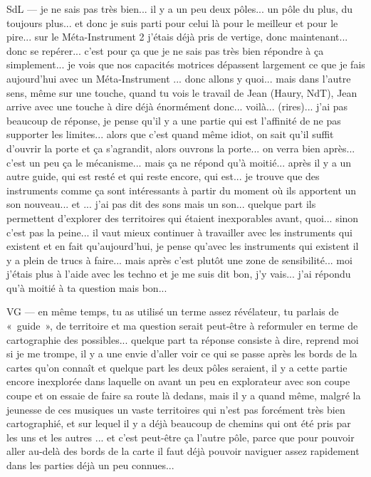 SdL — je ne sais pas très bien... il y a un peu deux pôles... un pôle du plus, du toujours plus... et donc je suis parti pour celui là pour le meilleur et pour le pire... sur le Méta-Instrument 2 j'étais déjà pris de vertige, donc maintenant... donc se repérer... c'est pour ça que je ne sais pas très bien répondre à ça simplement... je vois que nos capacités motrices dépassent largement ce que je fais aujourd'hui avec un Méta-Instrument ... donc allons y quoi... mais dans l'autre sens, même sur une touche, quand tu vois le travail de Jean (Haury, NdT), Jean arrive avec une touche à dire déjà énormément donc... voilà... (rires)... j'ai pas beaucoup de réponse, je pense qu'il y a une partie qui est l'affinité de ne pas supporter les limites... alors que c'est quand même idiot, on sait qu'il suffit d'ouvrir la porte et ça s'agrandit, alors ouvrons la porte... on verra bien après... c'est un peu ça le mécanisme... mais ça ne répond qu'à moitié... après il y a un autre guide, qui est resté et qui reste encore, qui est... je trouve que des instruments comme ça sont intéressants à partir du moment où ils apportent un son nouveau... et ... j'ai pas dit des sons mais un son... quelque part ils permettent d'explorer des territoires qui étaient inexporables avant, quoi... sinon c'est pas la peine... il vaut mieux continuer à travailler avec les instruments qui existent et en fait qu'aujourd'hui, je pense qu'avec les instruments qui existent il y a plein de trucs à faire... mais après c'est plutôt une zone de sensibilité... moi j'étais plus à l'aide avec les techno et je me suis dit bon, j'y vais... j'ai répondu qu'à moitié à ta question mais bon... 

VG — en même temps, tu as utilisé un terme assez révélateur, tu parlais de « guide », de territoire et ma question serait peut-être à reformuler en terme de cartographie des possibles... quelque part ta réponse consiste à dire, reprend moi si je me trompe, il y a une envie d'aller voir ce qui se passe après les bords de la cartes qu'on connaît et quelque part les deux pôles seraient, il y a cette partie encore inexplorée dans laquelle on avant un peu en explorateur avec son coupe coupe et on essaie de faire sa route là dedans, mais il y a quand même, malgré la jeunesse de ces musiques un vaste territoires qui n'est pas forcément très bien cartographié, et sur lequel il y a déjà beaucoup de chemins qui ont été pris par les uns et les autres ... et c'est peut-être ça l'autre pôle, parce que pour pouvoir aller au-delà des bords de la carte il faut déjà pouvoir naviguer assez rapidement dans les parties déjà un peu connues... 

